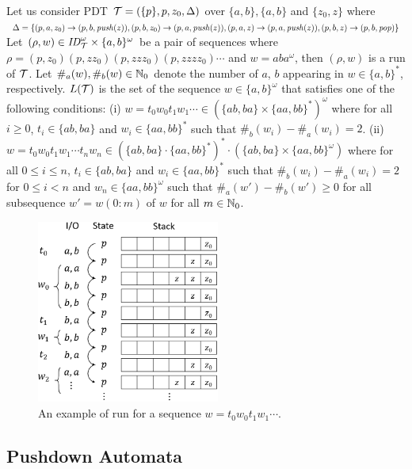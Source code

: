 \begin{example}
\label{ex: PDT}
Let us consider PDT
${\cal T} = (\{p\},p,z_0,\Delta)$
over $\{a,b\},\{a,b\}$ and $\{z_0,z\}$ where
$\Delta = \{
(p, a, z_0) \rightarrow (p, b, \mathit{push}(z)),
(p, b, z_0) \rightarrow (p, a, \mathit{push}(z)),
(p, a, z) \rightarrow (p, a, \mathit{push}(z)),
(p, b, z) \rightarrow (p, b, \mathit{pop})
\}$
Let $(\rho,w)\in \mathit{ID}_{\cal T}^\omega\times \{a,b\}^\omega$
be a pair of sequences where
$\rho=(p,z_0)(p,zz_0)(p,zzz_0)(p,zzzz_0)\cdots$ and $w=aba^\omega$,
then $(\rho,w)$ is a run of ${\cal T}$.
Let $\#_a(w), \#_b(w)\in \mathbb{N}_0$ denote the number of $a$, $b$
appearing in $w\in\{a,b\}^*$, respectively.
$L({\cal T})$ is the set of the sequence $w\in \{a,b\}^\omega$
that satisfies one of the following conditions:
(i) $w = t_0 w_0 t_1 w_1\cdots
\in(\{ab, ba\} \times \{aa, bb\}^*)^\omega$
where for all $i\geq 0$, $t_i\in \{ab, ba\}$ and
$w_i\in \{aa, bb\}^*$ such that
$\#_b(w_i)-\#_a(w_i)=2$.
(ii) $w = t_0 w_0 t_1 w_1\cdots t_n w_n
\in(\{ab, ba\}\cdot\{aa, bb\}^*)^*\cdot(\{ab, ba\} \times \{aa, bb\}^\omega)$
where for all $0\leq i\leq n$, $t_i\in \{ab, ba\}$ and
$w_i\in \{aa, bb\}^*$ such that
$\#_b(w_i)-\#_a(w_i)=2$ for $0\leq i< n$ and
$w_n\in \{aa, bb\}^\omega$ such that
$\#_a(w')-\#_b(w')\geq 0$
for all subsequence $w'=w(0:m)$ of $w$ for all $m\in\mathbb{N}_0$.
\begin{figure}[t]
  \centering
  \includegraphics[width=6cm]{PDT.png}
  \caption{An example of run for a sequence $w = t_0 w_0 t_1 w_1\cdots$.}
  \label{fig: PDT}
\end{figure}
\end{example}

\subsection{Pushdown Automata}

